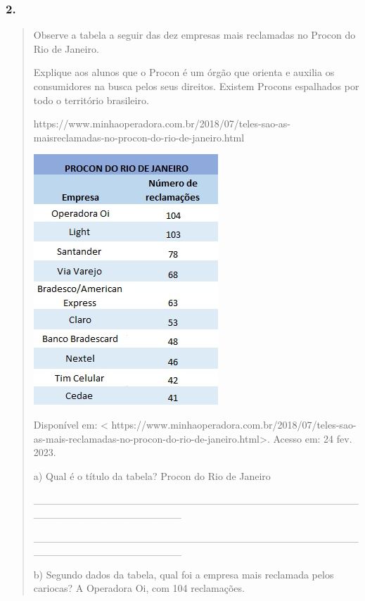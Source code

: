 \subsubsection{2. }\label{section-67}

\begin{quote}
Observe a tabela a seguir das dez empresas mais reclamadas no Procon do
Rio de Janeiro.

Explique aos alunos que o Procon é um órgão que orienta e auxilia os
consumidores na busca pelos seus direitos. Existem Procons espalhados
por todo o território brasileiro.

https://www.minhaoperadora.com.br/2018/07/teles-sao-as-maisreclamadas-no-procon-do-rio-de-janeiro.html

\includegraphics[width=2.72917in,height=3.70833in]{media/image30.jpeg}

Disponível em: \protect\hypertarget{_Hlk128145216}{}{}\textless{}
https://www.minhaoperadora.com.br/2018/07/teles-sao-as-mais-reclamadas-no-procon-do-rio-de-janeiro.html\textgreater{}.
Acesso em: 24 fev. 2023.

a) Qual é o título da tabela? Procon do Rio de Janeiro

\_\_\_\_\_\_\_\_\_\_\_\_\_\_\_\_\_\_\_\_\_\_\_\_\_\_\_\_\_\_\_\_\_\_\_\_\_\_\_\_\_\_\_\_\_\_\_\_\_\_\_\_\_\_\_\_\_\_\_\_\_\_\_\_

\_\_\_\_\_\_\_\_\_\_\_\_\_\_\_\_\_\_\_\_\_\_\_\_\_\_\_\_\_\_\_\_\_\_\_\_\_\_\_\_\_\_\_\_\_\_\_\_\_\_\_\_\_\_\_\_\_\_\_\_\_\_\_\_

b) Segundo dados da tabela, qual foi a empresa mais reclamada pelos
cariocas? A Operadora Oi, com 104 reclamações.


\end{quote}
